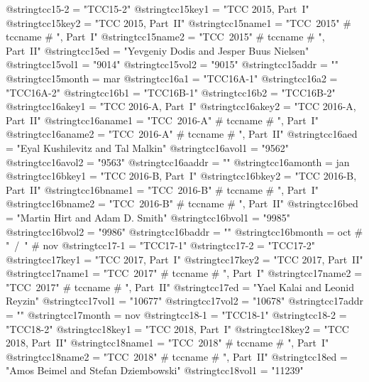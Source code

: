 @string{tcc15-2 =               "TCC15-2"}
@string{tcc15key1 =             "TCC 2015, Part~I"}
@string{tcc15key2 =             "TCC 2015, Part~II"}
@string{tcc15name1 =            "TCC~2015" # tccname  # ", Part~I"}
@string{tcc15name2 =            "TCC~2015" # tccname  # ", Part~II"}
@string{tcc15ed =               "Yevgeniy Dodis and Jesper Buus Nielsen"}
@string{tcc15vol1 =             "9014"}
@string{tcc15vol2 =             "9015"}
@string{tcc15addr =             ""}
@string{tcc15month =            mar}
@string{tcc16a1 =               "TCC16A-1"}
@string{tcc16a2 =               "TCC16A-2"}
@string{tcc16b1 =               "TCC16B-1"}
@string{tcc16b2 =               "TCC16B-2"}
@string{tcc16akey1 =            "TCC 2016-A, Part~I"}
@string{tcc16akey2 =            "TCC 2016-A, Part~II"}
@string{tcc16aname1 =           "TCC~2016-A" # tccname  # ", Part~I"}
@string{tcc16aname2 =           "TCC~2016-A" # tccname  # ", Part~II"}
@string{tcc16aed =              "Eyal Kushilevitz and Tal Malkin"}
@string{tcc16avol1 =            "9562"}
@string{tcc16avol2 =            "9563"}
@string{tcc16aaddr =            ""}
@string{tcc16amonth =           jan}
@string{tcc16bkey1 =            "TCC 2016-B, Part~I"}
@string{tcc16bkey2 =            "TCC 2016-B, Part~II"}
@string{tcc16bname1 =           "TCC~2016-B" # tccname  # ", Part~I"}
@string{tcc16bname2 =           "TCC~2016-B" # tccname  # ", Part~II"}
@string{tcc16bed =              "Martin Hirt and Adam D. Smith"}
@string{tcc16bvol1 =            "9985"}
@string{tcc16bvol2 =            "9986"}
@string{tcc16baddr =            ""}
@string{tcc16bmonth =           oct # "~/~" # nov}
@string{tcc17-1 =               "TCC17-1"}
@string{tcc17-2 =               "TCC17-2"}
@string{tcc17key1 =             "TCC 2017, Part~I"}
@string{tcc17key2 =             "TCC 2017, Part~II"}
@string{tcc17name1 =            "TCC~2017" # tccname  # ", Part~I"}
@string{tcc17name2 =            "TCC~2017" # tccname  # ", Part~II"}
@string{tcc17ed =               "Yael Kalai and Leonid Reyzin"}
@string{tcc17vol1 =             "10677"}
@string{tcc17vol2 =             "10678"}
@string{tcc17addr =             ""}
@string{tcc17month =            nov}
@string{tcc18-1 =               "TCC18-1"}
@string{tcc18-2 =               "TCC18-2"}
@string{tcc18key1 =             "TCC 2018, Part~I"}
@string{tcc18key2 =             "TCC 2018, Part~II"}
@string{tcc18name1 =            "TCC~2018" # tccname  # ", Part~I"}
@string{tcc18name2 =            "TCC~2018" # tccname  # ", Part~II"}
@string{tcc18ed =               "Amos Beimel and Stefan Dziembowski"}
@string{tcc18vol1 =             "11239"}
